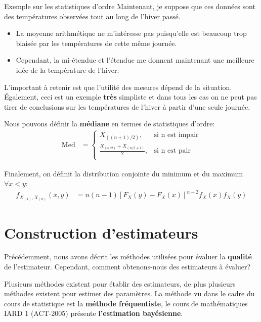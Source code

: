 \documentclass[10pt, french]{article}
\begin{document}
\begin{multicols*}{2}
\begin{conceptgen}{Exemple sur les statistiques d'ordre}
Maintenant, je suppose que ces données sont des températures observées tout au long de l'hiver passé.
\begin{itemize}[leftmargin = *]
	\item	La moyenne arithmétique ne m'intéresse pas puisqu'elle est beaucoup trop biaisée par les températures de cette même journée. 
	\item	Cependant, la mi-étendue et l'étendue me donnent maintenant une meilleure idée de la température de l'hiver.
\end{itemize}

L'important à retenir est que l'utilité des mesures dépend de la situation. Également, ceci est un exemple \textbf{très} simpliste et dans tous les cas on ne peut pas tirer de conclusions sur les températures de l'hiver à partir d'une seule journée.
\end{conceptgen}

Nous pouvons définir la \textbf{médiane} en termes de statistiques d'ordre:
\begin{align*}
	\text{Med}
	&=	\left\{
		\begin{matrix}
			X_{((n + 1)/2)},		&	\text{si n est impair}	\\
			\frac{X_{(n/2)} + X_{(n/2 + 1)}}{2},	&	\text{si n est pair}	\\
		\end{matrix}
	\right.
\end{align*}

Finalement, on définit la distribution conjointe du minimum et du maximum $\forall x < y$:
\begin{align*}
	f_{X_{(1)}, X_{(n)}}(x, y)
	&=	n (n - 1) [F_{X}(y) - F_{X}(x)]^{n - 2} f_{X}(x) f_{X}(y)
\end{align*}

\columnbreak
\section{Construction d'estimateurs}

Précédemment, nous avons décrit les méthodes utilisées pour évaluer la \textbf{qualité} de l'estimateur. 
Cependant, comment obtenons-nous des estimateurs à évaluer?

Plusieurs méthodes existent pour établir des estimateurs, de plus plusieurs méthodes existent pour estimer des paramètres.
La méthode vu dans le cadre du cours de statistique est la \textbf{méthode fréquentiste}, le cours de mathématiques IARD 1 (ACT-2005) présente \textbf{l'estimation bayésienne}.


\end{multicols*}
\end{document}

